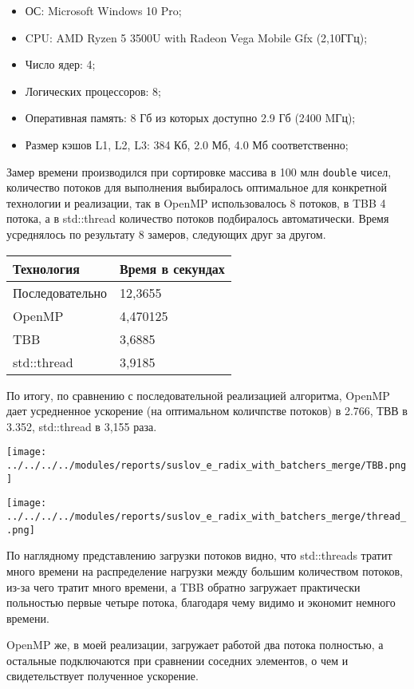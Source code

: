 \documentclass{article}
\begin{document}
\begin{itemize}
\item ОС: Microsoft Windows 10 Pro;
\item CPU: AMD Ryzen 5 3500U with Radeon Vega Mobile Gfx (2,10ГГц);
\item Число ядер: 4;
\item Логических процессоров: 8;
\item Оперативная память: 8 Гб из которых доступно 2.9 Гб (2400 MГц);
\item Размер кэшов L1, L2, L3: 384 Кб, 2.0 Мб, 4.0 Мб соответственно;
\end{itemize}

\par Замер времени производился при сортировке массива в 100 млн \verb|double| чисел, количество потоков для выполнения выбиралось оптимальное для конкретной технологии и реализации, так в OpenMP использовалось 8 потоков, в TBB 4 потока, а в std::thread количество потоков подбиралось автоматически. Время усреднялось по результату 8 замеров, следующих друг за другом.

\begin{tabular}{ | l | l | }
\hline
\textbf{Технология} & \textbf{Время в секундах}  \\ \hline
Последовательно & 12,3655  \\
OpenMP & 4,470125  \\
TBB & 3,6885   \\
std::thread & 3,9185 \\
\hline
\end{tabular}
\par По итогу, по сравнению с последовательной реализацией алгоритма, OpenMP дает усредненное ускорение (на оптимальном количпстве потоков) в 2.766, ТВВ в 3.352, std::thread в 3,155 раза.

\begin{center}
\texttt{[image: ../../../../modules/reports/suslov\_e\_radix\_with\_batchers\_merge/TBB.png]}
\label{visina1}
\end{center}

\begin{center}
\texttt{[image: ../../../../modules/reports/suslov\_e\_radix\_with\_batchers\_merge/thread\_.png]}
\label{visina1}
\end{center}

\par По наглядному представлению загрузки потоков видно, что std::threads тратит много времени на распределение нагрузки между большим количеством потоков, из-за чего тратит много времени, а TBB обратно загружает практически польностью первые четыре потока, благодаря чему видимо и экономит немного времени.
\par OpenMP же, в моей реализации, загружает работой два потока полностью, а остальные подключаются при сравнении соседних элементов, о чем и свидетельствует полученное ускорение.
\newpage
\end{document}
